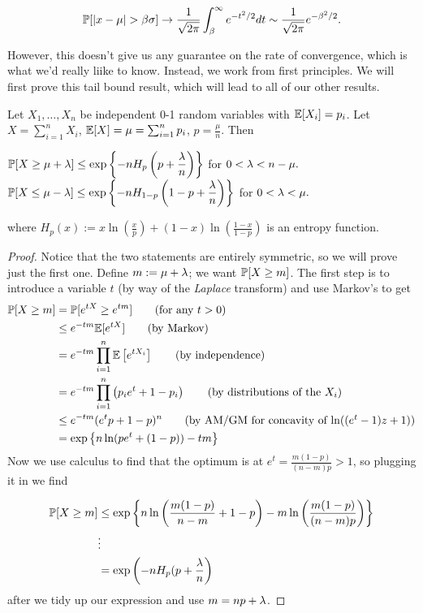 \documentclass[11 pt]{scrartcl}
\begin{document}
\[ \mathbb P[|x-\mu| > \beta \sigma] \to \dfrac{1}{\sqrt{2\pi}} \int_{\beta}^\infty e^{-t^2/2} dt \sim \dfrac{1}{\sqrt{2\pi}} e^{-\beta^2/2}.\] 

However, this doesn't give us any guarantee on the rate of convergence, which is what we'd really liike to know. Instead, we work from first principles. We will first prove this tail bound result, which will lead to all of our other results.  

\begin{theorem}
    Let $X_1, \dots, X_n$ be independent 0-1 random variables with $\mathbb E[X_i] = p_i$. Let $X = \sum_{i=1}^n X_i$, $\mathbb E[X] = \mu = \sum_{i=1}^n p_i$, $p = \frac{\mu}{n}$. Then 
    \begin{enumerate}
        \ii $\mathbb P[X \geq \mu + \lambda] \leq \exp\left\{ -n H_p\left(p + \dfrac{\lambda}{n}\right)\right\}$ for $0 < \lambda < n-\mu.$
        \ii $\mathbb P[X \leq \mu - \lambda] \leq \exp\left\{ -n H_{1-p}\left(1-p + \dfrac{\lambda}{n}\right)\right\}$ for $0 < \lambda < \mu.$
    \end{enumerate}
    where $H_p(x) := x\ln\left(\frac{x}{p}\right) + (1-x) \ln\left(\frac{1-x}{1-p}\right)$ is an entropy function. 
\end{theorem}

\begin{proof}
    Notice that the two statements are entirely symmetric, so we will prove just the first one. Define $m := \mu + \lambda$; we want $\mathbb P[X \geq m]$. The first step is to introduce a variable $t$ (by way of the \emph{Laplace} transform) and use Markov's to get 
    \begin{align*}
        \mathbb P[X\geq m] &= \mathbb P[e^{tX} \geq e^{tm}] \tag*{(for any $t>0$) } \\ 
                     &\leq e^{-tm} \mathbb E[e^{tX}] \tag*{(by Markov)} \\ 
                     &= e^{-tm} \prod_{i=1}^n \mathbb E\left[e^{tX_i}\right] \tag*{(by independence)} \\ 
                     &= e^{-tm} \prod_{i=1}^n \left(p_ie^t + 1 - p_i\right) \tag*{(by distributions of the $X_i$)} \\ 
                     &\leq e^{-tm} (e^tp + 1 - p)^n \tag*{(by AM/GM for concavity of $\ln((e^t-1)z+1)$)} \\ 
                     &= \exp\left\{ n \ln(pe^t + (1-p)) - tm \right\}
    \end{align*}
    Now we use calculus to find that the optimum is at $e^t = \frac{m(1-p)}{(n-m)p} > 1$, so plugging it in we find 

    \begin{align*}
        \mathbb P[X \geq m] &\leq \exp\left\{ n\ln \left(\dfrac{m(1-p)}{n-m}+1-p\right) - m \ln\left(\dfrac{m(1-p)}{(n-m)p}\right)\right\} \\ 
                      & \vdots \\ 
                      &= \exp\left(-n H_p(p + \frac{\lambda}{n}\right)
    \end{align*}
    after we tidy up our expression and use $m = np + \lambda$. 
\end{proof}
\end{document}
